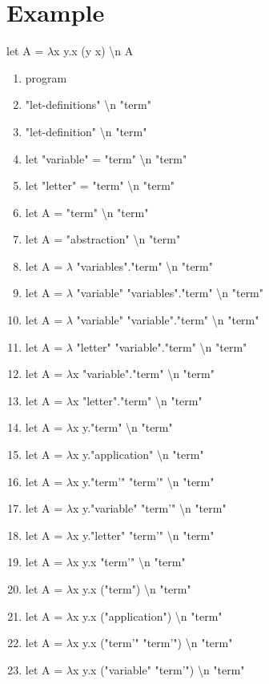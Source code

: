 \documentclass{article}
\begin{document}
\section{Example}
let A = $\lambda$x y.x (y x) \textbackslash n A
\begin{enumerate}
    \item program
    \item "let-definitions" \textbackslash n "term"
    \item "let-definition" \textbackslash n "term"
    \item let "variable" = "term" \textbackslash n "term"
    \item let "letter" = "term" \textbackslash n "term"
    \item let A = "term" \textbackslash n "term"
    \item let A = "abstraction" \textbackslash n "term"
    \item let A = $\lambda$ "variables"."term" \textbackslash n "term"
    \item let A = $\lambda$ "variable" "variables"."term" \textbackslash n "term"
    \item let A = $\lambda$ "variable" "variable"."term" \textbackslash n "term"
    \item let A = $\lambda$ "letter" "variable"."term" \textbackslash n "term"
    \item let A = $\lambda$x "variable"."term" \textbackslash n "term"
    \item let A = $\lambda$x "letter"."term" \textbackslash n "term"
    \item let A = $\lambda$x y."term" \textbackslash n "term"
    \item let A = $\lambda$x y."application" \textbackslash n "term"
    \item let A = $\lambda$x y."term'" "term'" \textbackslash n "term"
    \item let A = $\lambda$x y."variable" "term'" \textbackslash n "term"
    \item let A = $\lambda$x y."letter" "term'" \textbackslash n "term"
    \item let A = $\lambda$x y.x "term'" \textbackslash n "term"
    \item let A = $\lambda$x y.x ("term") \textbackslash n "term"
    \item let A = $\lambda$x y.x ("application") \textbackslash n "term"
    \item let A = $\lambda$x y.x ("term'" "term'") \textbackslash n "term"
    \item let A = $\lambda$x y.x ("variable" "term'") \textbackslash n "term"

\end{enumerate}
\end{document}
